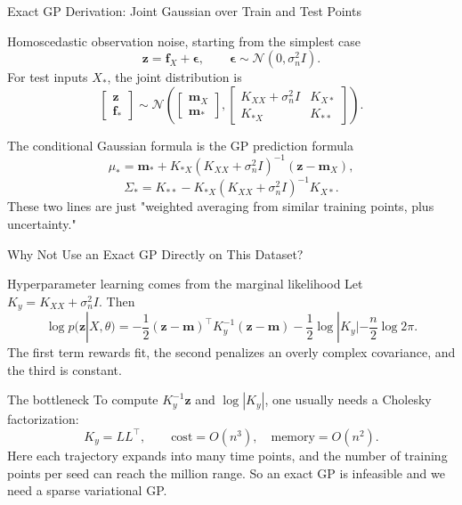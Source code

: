 \documentclass[aspectratio=169,11pt]{beamer}
\begin{document}
\begin{frame}{Exact GP Derivation: Joint Gaussian over Train and Test Points}
\small
\begin{block}{Homoscedastic observation noise, starting from the simplest case}
\footnotesize
\[
\mathbf z=\mathbf f_X+\boldsymbol\epsilon,
\qquad
\boldsymbol\epsilon\sim\mathcal N(0,\sigma_n^2I).
\]
For test inputs \(X_*\), the joint distribution is
\[
\begin{bmatrix}
\mathbf z\\
\mathbf f_*
\end{bmatrix}
\sim
\mathcal N\left(
\begin{bmatrix}
\mathbf m_X\\
\mathbf m_*
\end{bmatrix},
\begin{bmatrix}
K_{XX}+\sigma_n^2I & K_{X*}\\
K_{*X} & K_{**}
\end{bmatrix}
\right).
\]
\end{block}

\begin{block}{The conditional Gaussian formula is the GP prediction formula}
\footnotesize
\[
\mu_*=\mathbf m_*+K_{*X}(K_{XX}+\sigma_n^2I)^{-1}(\mathbf z-\mathbf m_X),
\]
\[
\Sigma_*=K_{**}-K_{*X}(K_{XX}+\sigma_n^2I)^{-1}K_{X*}.
\]
These two lines are just "weighted averaging from similar training points, plus uncertainty."
\end{block}
\end{frame}

\begin{frame}{Why Not Use an Exact GP Directly on This Dataset?}
\small
\begin{block}{Hyperparameter learning comes from the marginal likelihood}
\footnotesize
Let \(K_y=K_{XX}+\sigma_n^2I\). Then
\[
\log p(\mathbf z|X,\theta)
=-\frac{1}{2}(\mathbf z-\mathbf m)^\top K_y^{-1}(\mathbf z-\mathbf m)
-\frac{1}{2}\log|K_y|-\frac{n}{2}\log 2\pi.
\]
The first term rewards fit, the second penalizes an overly complex covariance, and the third is constant.
\end{block}

\begin{block}{The bottleneck}
\footnotesize
To compute \(K_y^{-1}\mathbf z\) and \(\log|K_y|\), one usually needs a Cholesky factorization:
\[
K_y=LL^\top,\qquad \mathrm{cost}=O(n^3),\quad \mathrm{memory}=O(n^2).
\]
Here each trajectory expands into many time points, and the number of training points per seed can reach the million
range. So an exact GP is infeasible and we need a sparse variational GP.
\end{block}
\end{frame}
\end{document}
